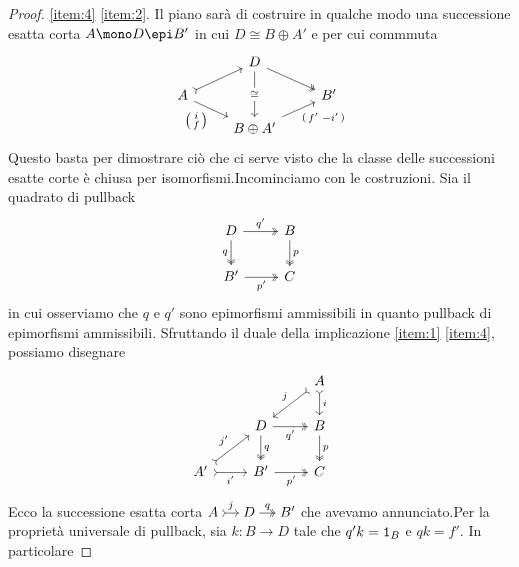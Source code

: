 \begin{proof}
  \ref{item:4} \Rightarrow \ref{item:2}. Il piano sarà di costruire in
  qualche modo una successione esatta corta \(A \mono D \epi B'\) in cui
  \(D \cong B \oplus A'\) e per cui commmuta
  \[
    \begin{tikzcd}[row sep=small, ampersand replacement=\&]
      \& D \ar["{\cong}" description, dd] \ar["{}", twoheadrightarrow, dr] \\
      A \ar["{}", rightarrowtail, ur] \ar["{\begin{psmallmatrix} i \\
        f \end{psmallmatrix}}", dr, swap] \& \& B' \\
    \& B \oplus A' \ar["{\begin{psmallmatrix} f' &
        -i' \end{psmallmatrix}}", ur, swap]
  \end{tikzcd}
\]
Questo basta per dimostrare ciò che ci serve visto che la classe delle
successioni esatte corte è chiusa per isomorfismi.\newline Incominciamo
con le costruzioni. Sia il quadrato di pullback
\[
  \begin{tikzcd}
    D \ar["{q}", twoheadrightarrow, d, swap] \ar["{q'}",
    twoheadrightarrow, r] & B \ar["{p}", twoheadrightarrow, d] \\
    B' \ar["{p'}", r, twoheadrightarrow, swap] & C
  \end{tikzcd}
\]
in cui osserviamo che \(q\) e \(q'\) sono epimorfismi ammissibili in
quanto pullback di epimorfismi ammissibili. Sfruttando il duale della
implicazione \ref{item:1} \Rightarrow \ref{item:4}, possiamo disegnare
\[
  \begin{tikzcd}
    & & A \ar["{j}", rightarrowtail, dl, swap] \ar["{i}", rightarrowtail, d] \\
    & D \ar["{q}", twoheadrightarrow, d] \ar["{q'}",
    twoheadrightarrow, r, swap] & B \ar["{p}", twoheadrightarrow, d] \\
    A' \ar["{j'}", rightarrowtail, ur] \ar["{i'}", rightarrowtail, r,
    swap] & B' \ar["{p'}", r, twoheadrightarrow, swap] & C
  \end{tikzcd}
\]
Ecco la successione esatta corta
\(\begin{tikzcd}[column sep=small, cramped] A \ar["{j}", rightarrowtail,
  r] & D \ar["{q}", twoheadrightarrow, r] & B' \end{tikzcd}\) che
avevamo annunciato.\newline Per la proprietà universale di pullback, sia
\(k : B \to D\) tale che \(q'k = \mathtt 1_B\) e \(qk = f'\). In particolare

\end{proof}
